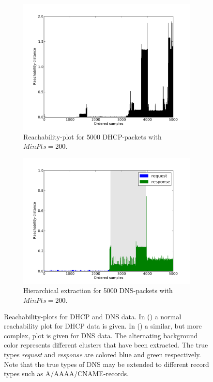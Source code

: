 \documentclass[a4paper]{report}
\begin{document}
\begin{figure}[h]
    \centering
    \begin{subfigure}[b]{0.48\textwidth}
        \includegraphics[width=\textwidth]{img/rplot_dhcp}
        \caption{Reachability-plot for 5000 DHCP-packets with $MinPts = 200$.}
        \label{fig:rplot}
    \end{subfigure}
    \quad
    \begin{subfigure}[b]{0.48\textwidth}
        \includegraphics[width=\textwidth]{img/hierextr}
        \caption{Hierarchical extraction for 5000 DNS-packets with
        $MinPts = 200$.}
        \label{fig:hierextr}
    \end{subfigure}
    \caption{Reachability-plots for DHCP and DNS data. In ()
        a normal reachability plot for DHCP data is given. In
        () a similar, but more complex, plot is given for
        DNS data. The alternating background color represents different clusters
        that have been extracted. The true types \emph{request} and
        \emph{response} are colored blue and green respectively. Note that the
        true types of DNS may be extended to different record types such as
        A/AAAA/CNAME-records.}
    \label{fig:rplots}
\end{figure}
\end{document}
